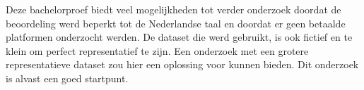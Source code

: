 Deze bachelorproef biedt veel mogelijkheden tot verder onderzoek doordat de beoordeling werd beperkt tot de Nederlandse taal en doordat er geen betaalde platformen onderzocht werden. De dataset die werd gebruikt, is ook fictief en te klein om perfect representatief te zijn. Een onderzoek met een grotere representatieve dataset zou hier een oplossing voor kunnen bieden. Dit onderzoek is alvast een goed startpunt.





























